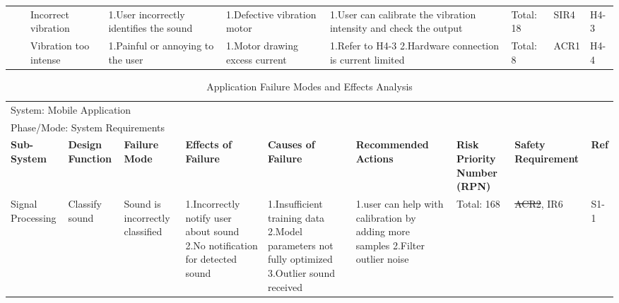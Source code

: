 \documentclass{article}
\begin{document}
\begin{landscape}
\begin{table}[H]
\begin{tabular}{| p{} | p{}  | p{} | p{} | p{} | p{} | p{} | p{} | p{} |}
         & & Incorrect vibration & 1.User incorrectly identifies the sound & 1.Defective vibration motor & 1.User can calibrate the vibration intensity and check the output  & Total: 18 & SIR4 & H4-3 \\ \cline{3-9}
     
         & & Vibration too intense & 1.Painful or annoying to the user & 1.Motor drawing excess current & 1.Refer to H4-3 \newline 2.Hardware connection is current limited & Total: 8 & ACR1 & H4-4 \\ \hline
     
        \end{tabular}
        \hspace*{-1cm}
\end{table}

\begin{table}[H]

    \caption{Application Failure Modes and Effects Analysis}
    \centering
    \begin{tabular}{| p{} | p{}  | p{} | p{} | p{} | p{} | p{} | p{} | p{} |}
     \hline
    
    \multicolumn{9}{|l|}{System: Mobile Application } \\
    \multicolumn{9}{|l|}{Phase/Mode: System Requirements} \\ \hline
    \textbf{Sub-System} & \textbf{Design Function} & \textbf{Failure Mode} & \textbf{Effects of Failure} & \textbf{Causes of Failure} & \textbf{Recommended Actions} & \textbf{Risk Priority Number (RPN)} & \textbf{Safety Requirement} & \textbf{Ref} \\ \hline

    Signal Processing & Classify sound & Sound is incorrectly classified & 1.Incorrectly notify user about sound \newline 2.No notification for detected sound & 1.Insufficient training data \newline 2.Model parameters not fully optimized \newline 3.Outlier sound received  & 1.user can help with calibration by adding more samples \newline 2.Filter outlier noise  & Total: 168 & \sout{ACR2}, IR6 & S1-1 \\ \cline{3-9}
    

\end{tabular}
\end{table}
\end{landscape}
\end{document}
